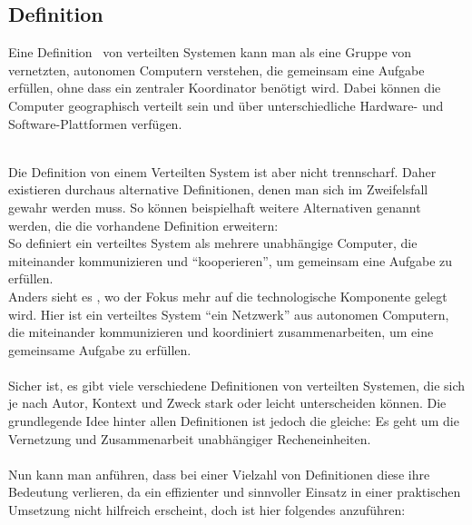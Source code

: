 \subsection{Definition}

Eine Definition~\cite{coulouris2012distributed} von verteilten Systemen kann man als eine Gruppe von vernetzten, autonomen Computern verstehen, die gemeinsam eine Aufgabe erfüllen, ohne dass ein zentraler Koordinator benötigt wird. Dabei können die Computer geographisch verteilt sein und über unterschiedliche Hardware- und Software-Plattformen verfügen.

\mbox{}\\
Die Definition von einem Verteilten System ist aber nicht trennscharf. Daher existieren durchaus alternative Definitionen, denen man sich im Zweifelsfall gewahr werden muss. So können beispielhaft weitere Alternativen genannt werden, die die vorhandene Definition erweitern: \\
So definiert \cite{garg2016distributed} ein verteiltes System als mehrere unabhängige Computer, die miteinander kommunizieren und \enquote{kooperieren}, um gemeinsam eine Aufgabe zu erfüllen.
\\
Anders sieht es \cite{mukherjee2015distributed}, wo der Fokus mehr auf die technologische Komponente gelegt wird. Hier ist ein verteiltes System \enquote{ein Netzwerk} aus autonomen Computern, die miteinander kommunizieren und koordiniert zusammenarbeiten, um eine gemeinsame Aufgabe zu erfüllen.
\\\\
Sicher ist, es gibt viele verschiedene Definitionen von verteilten Systemen, die sich je nach Autor, Kontext und Zweck stark oder leicht unterscheiden können. Die grundlegende Idee hinter allen Definitionen ist jedoch die gleiche: Es geht um die Vernetzung und Zusammenarbeit unabhängiger Recheneinheiten.
\\\\
Nun kann man anführen, dass bei einer Vielzahl von Definitionen diese ihre Bedeutung verlieren, da ein effizienter und sinnvoller Einsatz in einer praktischen Umsetzung nicht hilfreich erscheint, doch ist hier folgendes anzuführen: 

